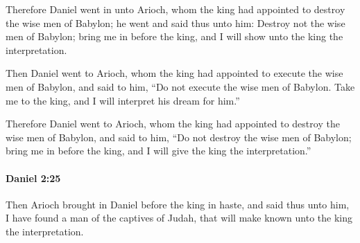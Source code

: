 			\begin{versebox}
					\item[BHS] 
					\item[LXX] 
					\item[ASV] Therefore Daniel went in unto Arioch, whom the king had appointed to destroy the wise men of Babylon; he went and said thus unto him: Destroy not the wise men of Babylon; bring me in before the king, and I will show unto the king the interpretation.
					\item[NIV] Then Daniel went to Arioch, whom the king had appointed to execute the wise men of Babylon, and said to him, “Do not execute the wise men of Babylon. Take me to the king, and I will interpret his dream for him.”
					\item[NRSV] Therefore Daniel went to Arioch, whom the king had appointed to destroy the wise men of Babylon, and said to him, “Do not destroy the wise men of Babylon; bring me in before the king, and I will give the king the interpretation.”
			\end{versebox}

		\paragraph{Daniel 2:25} %
			\label{DANIEL-2-25}

			Then Arioch brought in Daniel before the king in haste, and said thus unto him, I have found a man of the captives of Judah, that will make known unto the king the interpretation.

